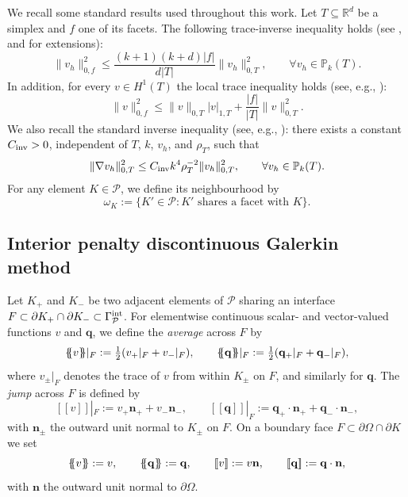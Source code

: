 \documentclass[11pt,final]{amsart}
\theoremstyle{plain}
\theoremstyle{definition}
\newcommand\calP{{\mathcal{P}}}
\newcommand{\mean}[1]{\{\kern-1.1mm\{#1\}\kern-1.1mm\}}
\newcommand{\jump}[1]{[\![#1]\!]}                        %
\begin{document}
We recall some standard results used throughout this work. Let $T
\subseteq \mathbb{R}^d$ be a simplex and $f$ one of its facets. The
following trace-inverse inequality holds (see \cite{war03}, and
\cite{DG-EASE} for extensions):
\begin{equation}\label{Trace-inverse}
  \|v_h\|_{0,f}^2  \le  \frac{(k+1)(k+d)|f|}{d|T|} \|v_h\|_{0,T}^2,
  \qquad \forall v_h \in \mathbb{P}_k(T).
\end{equation}
In addition, for every $v \in H^1(T)$ the local trace inequality holds
(see, e.g., \cite{EG21-I}):
\begin{equation}\label{local_trace_theorem}
  \|v\|_{0,f}^2
   \le  \|v\|_{0,T} |v|_{1,T} + \frac{|f|}{|T|} \|v\|_{0,T}^2.
\end{equation}
We also recall the standard inverse inequality (see, e.g.,
\cite{Sch98}): there exists a constant $C_{\rm inv}>0$, independent of
$T$, $k$, $v_h$, and $\rho_T$, such that
\begin{equation}\label{Standard-Inverse-Ineq}
  \|\nabla v_h\|_{0,T}^2  \le  C_{\rm inv} k^4 \rho_T^{-2} \|v_h\|_{0,T}^2,
  \qquad \forall v_h \in \mathbb{P}_k(T).
\end{equation}
For any element $K \in \calP$, we define its neighbourhood by
\[
  \omega_K := \{ K' \in \calP : K' \text{ shares a facet with } K \}.
\]
 
\subsection{Interior penalty discontinuous Galerkin method}

Let $K_+$ and $K_-$ be two adjacent elements of $\calP$ sharing an
interface $F \subset \partial K_+ \cap \partial K_- \subset
\Gamma_{\calP}^{\rm int}$.  For elementwise continuous scalar- and
vector-valued functions $v$ and $\mathbf{q}$, we define the
\emph{average} across $F$ by
\[
 \mean{v}|_F := \tfrac{1}{2}(v_+|_F + v_-|_F), 
 \qquad 
 \mean{\mathbf{q}}|_F := \tfrac{1}{2}(\mathbf{q}_+|_F + \mathbf{q}_-|_F),
\]
where $v_\pm|_F$ denotes the trace of $v$ from within $K_\pm$ on $F$,
and similarly for $\mathbf{q}$. The \emph{jump} across $F$ is defined
by
\[
 \jump{v}|_F := v_+ \mathbf{n}_+ + v_- \mathbf{n}_-,
 \qquad 
 \jump{\mathbf{q}}|_F := \mathbf{q}_+ \cdot \mathbf{n}_+ + \mathbf{q}_- \cdot \mathbf{n}_-,
\]
with $\mathbf{n}_\pm$ the outward unit normal to $K_\pm$ on $F$. On a
boundary face $F \subset \partial \Omega \cap \partial K$ we set
\[
 \mean{v} := v, 
 \qquad 
 \mean{\mathbf{q}} := \mathbf{q}, 
 \qquad 
 \jump{v} := v \mathbf{n}, 
 \qquad 
 \jump{\mathbf{q}} := \mathbf{q}\cdot \mathbf{n},
\]
with $\mathbf{n}$ the outward unit normal to $\partial \Omega$.
\end{document}
